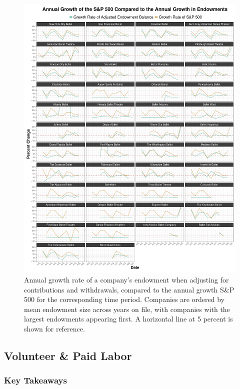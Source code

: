 \documentclass[Dance Data
Project,article,submit,moreauthors,pdftex]{mdpi}
\begin{document}
\begin{figure}[H]
\includegraphics[width=0.9\linewidth,]{../images/annual-growth} \caption{\label{fig:annual-growth-endowment} Annual growth rate of a company's endowment when adjusting for contributions and withdrawals, compared to the annual growth S\&P 500 for the corresponding time period. Companies are ordered by mean endowment size across years on file, with companies with the largest endowments appearing first. A horizontal line at 5 percent is shown for reference.}\label{fig:unnamed-chunk-13}
\end{figure}

\newpage

\hypertarget{volunteer-paid-labor}{%
\subsection{Volunteer \& Paid Labor}\label{volunteer-paid-labor}}

\hypertarget{key-takeaways-1}{%
\subsubsection{Key Takeaways}\label{key-takeaways-1}}
\end{document}
